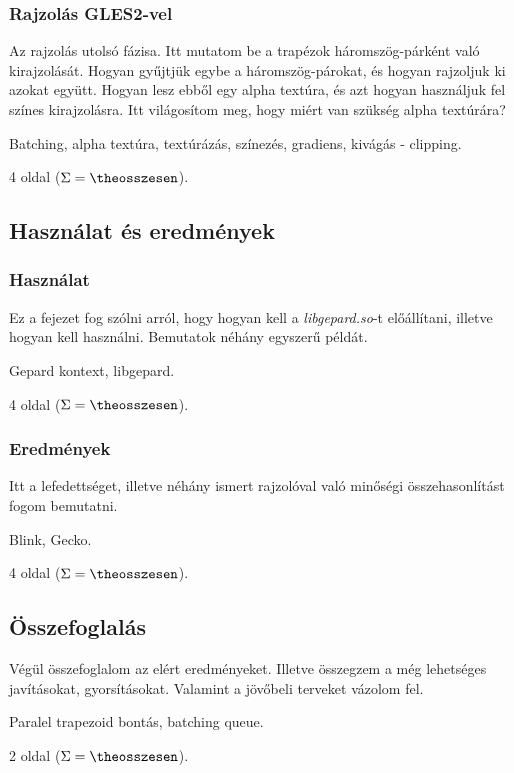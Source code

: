 \documentclass[12pt]{article}
\newcounter{osszesen}
\newcommand*{\oldalak}[1]{#1 oldal \setcounter{osszesen}{\theosszesen +
#1}($\Sigma=\theosszesen$)}
\begin{document}
  \subsubsection{Rajzolás GLES2-vel}
  Az rajzolás utolsó fázisa. Itt mutatom be a trapézok
  háromszög-párként való kirajzolását. Hogyan gyűjtjük egybe a
  háromszög-párokat, és hogyan rajzoljuk ki azokat együtt. Hogyan lesz
  ebből egy alpha textúra, és azt hogyan használjuk fel színes
  kirajzolásra. Itt világosítom meg, hogy miért van szükség alpha textúrára?

  \begin{description}[noitemsep]
    \item[Kulcsszavak] Batching, alpha textúra, textúrázás, színezés,
    gradiens, kivágás - clipping.
    \item[Becsült oldalszám] \oldalak{4}.
  \end{description}

\subsection{Használat és eredmények}
  \subsubsection{Használat}
  Ez a fejezet fog szólni arról, hogy hogyan kell a \emph{libgepard.so}-t
  előállítani, illetve hogyan kell használni. Bemutatok néhány egyszerű
  példát.

  \begin{description}[noitemsep]
    \item[Kulcsszavak] Gepard kontext, libgepard.
    \item[Becsült oldalszám] \oldalak{4}.
  \end{description}

  \subsubsection{Eredmények}
  Itt a lefedettséget, illetve néhány ismert rajzolóval való minőségi
  összehasonlítást fogom bemutatni.

  \begin{description}[noitemsep]
    \item[Kulcsszavak] Blink, Gecko.
    \item[Becsült oldalszám] \oldalak{4}.
  \end{description}

\subsection{Összefoglalás }
Végül összefoglalom az elért eredményeket. Illetve összegzem a még
lehetséges javításokat, gyorsításokat. Valamint a jövőbeli terveket vázolom fel.
\begin{description}[noitemsep]
  \item[Kulcsszavak] Paralel trapezoid bontás, batching queue.
  \item[Becsült oldalszám] \oldalak{2}.
\end{description}
\end{document}
